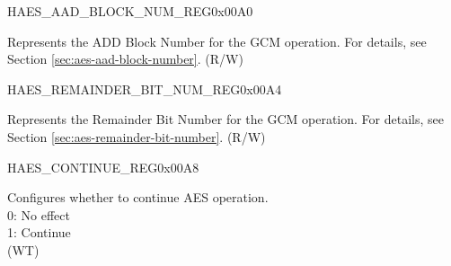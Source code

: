 \begin{register}{H}{AES\_AAD\_BLOCK\_NUM\_REG}{0x00A0}\label{regdesc:AESAADBLOCKNUMREG}
%
\regnewline%
\begin{regdesc}\begin{reglist}
\label{fielddesc:AESAADBLOCKNUM}\item [AES\_AAD\_BLOCK\_NUM] Represents the ADD Block Number for the GCM operation. For details, see Section \ref{sec:aes-aad-block-number}. (R/W)
\end{reglist}\end{regdesc}
\end{register}




\begin{register}{H}{AES\_REMAINDER\_BIT\_NUM\_REG}{0x00A4}\label{regdesc:AESREMAINDERBITNUMREG}
%
%
\regnewline%
\begin{regdesc}\begin{reglist}
\label{fielddesc:AESREMAINDERBITNUM}\item [AES\_REMAINDER\_BIT\_NUM] Represents the Remainder Bit Number for the GCM operation. For details, see Section \ref{sec:aes-remainder-bit-number}. (R/W)
\end{reglist}\end{regdesc}
\end{register}


\begin{register}{H}{AES\_CONTINUE\_REG}{0x00A8}\label{regdesc:AESCONTINUEREG}
%
%
\regnewline%
\begin{regdesc}\begin{reglist}
\label{fielddesc:AESCONTINUE}\item [AES\_CONTINUE\_REG] Configures whether to continue AES operation.\\
0: No effect\\
1: Continue \\
(WT)\\
\end{reglist}\end{regdesc}
\end{register}


